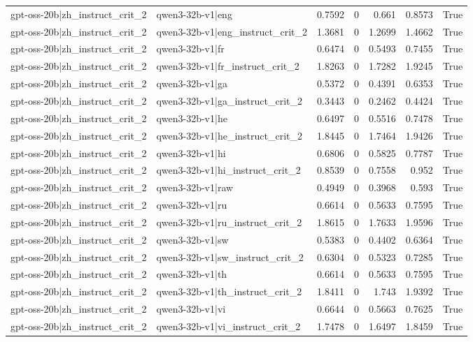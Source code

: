 \begin{table}
\begin{tabular}{l l r r r r l}
gpt-oss-20b|zh_instruct_crit_2 & qwen3-32b-v1|eng & 0.7592 & 0 & 0.661 & 0.8573 & True \\
gpt-oss-20b|zh_instruct_crit_2 & qwen3-32b-v1|eng_instruct_crit_2 & 1.3681 & 0 & 1.2699 & 1.4662 & True \\
gpt-oss-20b|zh_instruct_crit_2 & qwen3-32b-v1|fr & 0.6474 & 0 & 0.5493 & 0.7455 & True \\
gpt-oss-20b|zh_instruct_crit_2 & qwen3-32b-v1|fr_instruct_crit_2 & 1.8263 & 0 & 1.7282 & 1.9245 & True \\
gpt-oss-20b|zh_instruct_crit_2 & qwen3-32b-v1|ga & 0.5372 & 0 & 0.4391 & 0.6353 & True \\
gpt-oss-20b|zh_instruct_crit_2 & qwen3-32b-v1|ga_instruct_crit_2 & 0.3443 & 0 & 0.2462 & 0.4424 & True \\
gpt-oss-20b|zh_instruct_crit_2 & qwen3-32b-v1|he & 0.6497 & 0 & 0.5516 & 0.7478 & True \\
gpt-oss-20b|zh_instruct_crit_2 & qwen3-32b-v1|he_instruct_crit_2 & 1.8445 & 0 & 1.7464 & 1.9426 & True \\
gpt-oss-20b|zh_instruct_crit_2 & qwen3-32b-v1|hi & 0.6806 & 0 & 0.5825 & 0.7787 & True \\
gpt-oss-20b|zh_instruct_crit_2 & qwen3-32b-v1|hi_instruct_crit_2 & 0.8539 & 0 & 0.7558 & 0.952 & True \\
gpt-oss-20b|zh_instruct_crit_2 & qwen3-32b-v1|raw & 0.4949 & 0 & 0.3968 & 0.593 & True \\
gpt-oss-20b|zh_instruct_crit_2 & qwen3-32b-v1|ru & 0.6614 & 0 & 0.5633 & 0.7595 & True \\
gpt-oss-20b|zh_instruct_crit_2 & qwen3-32b-v1|ru_instruct_crit_2 & 1.8615 & 0 & 1.7633 & 1.9596 & True \\
gpt-oss-20b|zh_instruct_crit_2 & qwen3-32b-v1|sw & 0.5383 & 0 & 0.4402 & 0.6364 & True \\
gpt-oss-20b|zh_instruct_crit_2 & qwen3-32b-v1|sw_instruct_crit_2 & 0.6304 & 0 & 0.5323 & 0.7285 & True \\
gpt-oss-20b|zh_instruct_crit_2 & qwen3-32b-v1|th & 0.6614 & 0 & 0.5633 & 0.7595 & True \\
gpt-oss-20b|zh_instruct_crit_2 & qwen3-32b-v1|th_instruct_crit_2 & 1.8411 & 0 & 1.743 & 1.9392 & True \\
gpt-oss-20b|zh_instruct_crit_2 & qwen3-32b-v1|vi & 0.6644 & 0 & 0.5663 & 0.7625 & True \\
gpt-oss-20b|zh_instruct_crit_2 & qwen3-32b-v1|vi_instruct_crit_2 & 1.7478 & 0 & 1.6497 & 1.8459 & True \\

\end{tabular}
\end{table}
